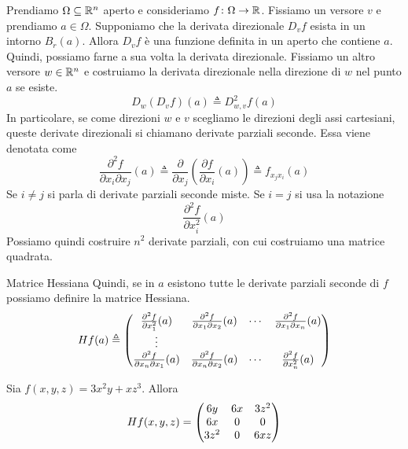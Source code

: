 \documentclass[a4paper]{article}
\begin{document}
\begin{radioactive}
Prendiamo \(\Omega \subseteq \mathbb{R}^n\) aperto
e consideriamo \(f \colon \Omega \to \mathbb{R}\).
Fissiamo un versore \(v\) e prendiamo \(a \in \Omega\).
Supponiamo che la derivata direzionale \(D_v f\) esista in un intorno
\(B_r(a)\).
Allora \(D_vf\) è una funzione
definita in un aperto che contiene \(a\).
Quindi, possiamo farne a sua volta la derivata direzionale.
Fissiamo un altro versore \(w \in \mathbb{R}^n\) e costruiamo la derivata direzionale
nella direzione di \(w\) nel punto \(a\) se esiste.
\[
    D_w(D_v f)(a) \triangleq D^2_{w,v} f(a)
\]
In particolare, se come direzioni \(w\) e \(v\) scegliamo le direzioni degli assi cartesiani,
queste derivate direzionali si chiamano derivate parziali seconde.
Essa viene denotata come
\[
    \frac{\partial^2 f}{\partial x_i \partial x_j}(a)
    \triangleq \frac{\partial}{\partial x_j} \left(
        \frac{\partial f}{\partial x_i}(a)
    \right) \triangleq f_{x_jx_i}(a)
\]
Se \(i \neq j\) si parla di derivate parziali seconde miste.
Se \(i = j\) si usa la notazione
\[
    \frac{\partial^2f}{\partial x_i^2}(a)
\]
Possiamo quindi costruire \(n^2\)
derivate parziali, con cui costruiamo una matrice quadrata.
\end{radioactive}

\begin{radioactive}
\begin{snippetdefinition}{Matrice Hessiana}
    Quindi, se in \(a\) esistono tutte le derivate parziali seconde di \(f\)
    possiamo definire la matrice Hessiana.
    \[
        H f(a) \triangleq \begin{pmatrix}
            \frac{\partial^2 f}{\partial x_1^2}(a) &
            \frac{\partial^2 f}{\partial x_1\partial x_2}(a) & \cdots &
            \frac{\partial^2 f}{\partial x_1\partial x_n}(a) \\
            \vdots \\
            \frac{\partial^2 f}{\partial x_n \partial x_1}(a) &
            \frac{\partial^2 f}{\partial x_n \partial x_2}(a) & \cdots &
            \frac{\partial^2 f}{\partial x_n^2}(a)
        \end{pmatrix}
    \]
\end{snippetdefinition}
\end{radioactive}

\begin{radioactive}
\begin{snippetexample}{}
    Sia \(f(x,y,z) = 3x^2y + xz^3\). Allora
    \[
        H f(x,y,z) = \begin{pmatrix}
            6y & 6x & 3z^2 \\
            6x & 0 & 0 \\
            3z^2 & 0 & 6xz
        \end{pmatrix}
    \]
\end{snippetexample}
\end{radioactive}
\end{document}
